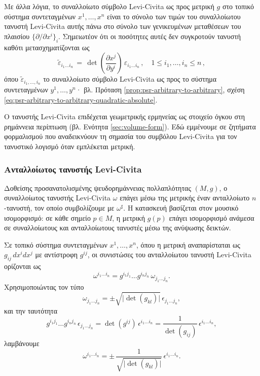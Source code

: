 \documentclass[11pt,a4paper,twoside,openright]{book}
\begin{document}
\noindent
Με άλλα λόγια, το συναλλοίωτο σύμβολο Levi-Civita ως προς μετρική $g$ στο τοπικό σύστημα συντεταγμένων $x^1, \dots, x^n$ είναι το σύνολο των τιμών του συναλλοίωτου τανυστή Levi-Civita αυτής πάνω στο σύνολο των γενικευμένων μεταθέσεων του πλαισίου $\{\partial/\partial x^i\}_i$.
Σημειωτέον ότι οι ποσότητες αυτές δεν συγκροτούν τανυστή καθότι μετασχηματίζονται ως
\begin{equation}\label{eq:covariant-levi-civita-symbol-transform}
\tilde{\varepsilon}_{i_1 \dots i_n}
\,
=
\,
\det \left( \frac{\partial x^j}{\partial y^i} \right)
\,
\varepsilon_{i_1 \dots i_n}\,,
\quad
1 \le i_1, \dots, i_n \le n\,,
\end{equation}
όπου
$\tilde{\varepsilon}_{i_1, \dots, i_n}$
το συναλλοίωτο σύμβολο Levi-Civita ως προς το σύστημα συντεταγμένων
$y^1, \dots, y^n$·
βλ. Πρόταση \ref{prop:psr-arbitrary-to-arbitrary},
σχέση \eqref{eq:psr-arbitrary-to-arbitrary-quadratic-absolute}.

Ο τανυστής Levi-Civita επιδέχεται γεωμετρικής ερμηνείας
ως στοιχείο όγκου στη ρημάννεια περίπτωση (βλ. Ενότητα \ref{sec:volume-form}).
Εδώ εμμένουμε σε ζητήματα φορμαλισμού
που αναδεικνύουν τη σημασία του συμβόλου Levi-Civita
για τον τανυστικό λογισμό όταν εμπλέκεται μετρική.

\subsubsection{Ανταλλοίωτος τανυστής Levi-Civita}
	\label{sec:contravariant-levi-civita-tensor}

Δοθείσης προσανατολισμένης ψευδορημάννειας πολλαπλότητας $(M, g)$, ο συναλλοίωτος τανυστής Levi-Civita $\omega$ επάγει μέσω της μετρικής έναν ανταλλοίωτο $n$-τανυστή, τον οποίο συμβολίζουμε με $\omega^\sharp$. Η κατασκευή βασίζεται στον μουσικό ισομορφισμό: σε κάθε σημείο $p \in M$, η μετρική $g(p)$ επάγει ισομορφισμό ανάμεσα σε συναλλοίωτους και ανταλλοίωτους τανυστές μέσω της ανύψωσης δεικτών.

Σε τοπικό σύστημα συντεταγμένων $x^1, \dots, x^n$, όπου η μετρική αναπαρίσταται ως $g_{ij}\,dx^i dx^j$ με αντίστροφη $g^{ij}$, οι συνιστώσες του ανταλλοίωτου τανυστή Levi-Civita ορίζονται ως
\begin{equation*}
\omega^{i_1 \dots i_n}
=
g^{i_1 j_1} \dots g^{i_n j_n}
\,
\omega_{j_1 \dots j_n}.
\end{equation*}
Χρησιμοποιώντας τον τύπο
\begin{equation*}
\omega_{j_1 \dots j_n}
=
\pm \sqrt{\lvert \det(g_{kl}) \rvert}
\,
\epsilon_{j_1 \dots j_n},
\end{equation*}
και την ταυτότητα
\begin{equation*}
g^{i_1 j_1} \dots g^{i_n j_n}
\,
\epsilon_{j_1 \dots j_n}
=
\det(g^{ij})
\,
\epsilon^{i_1 \dots i_n}
=
\frac{1}{\det(g_{ij})}
\,
\epsilon^{i_1 \dots i_n},
\end{equation*}
λαμβάνουμε
\begin{equation*}
\omega^{i_1 \dots i_n}
=
\pm
\,
\frac{1}{\sqrt{\lvert \det(g_{kl}) \rvert}}
\,
\epsilon^{i_1 \dots i_n}.
\end{equation*}
\end{document}
